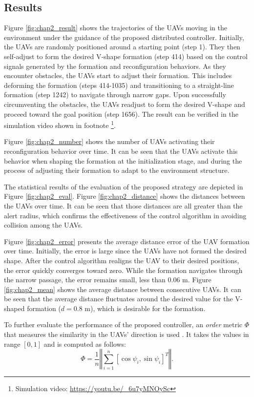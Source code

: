 \subsection{Results}

Figure \ref{fig:chap2_result} shows the trajectories of the UAVs moving in the environment under the guidance of the proposed distributed controller. Initially, the UAVs are randomly positioned around a starting point (step 1). They then self-adjust to form the desired V-shape formation (step 414) based on the control signals generated by the formation and reconfiguration behaviors. As they encounter obstacles, the UAVs start to adjust their formation. This includes deforming the formation (steps 414-1035) and transitioning to a straight-line formation (step 1242) to navigate through narrow gaps. Upon successfully circumventing the obstacles, the UAVs readjust to form the desired V-shape and proceed toward the goal position (step 1656). The result can be verified in the simulation video shown in footnote \footnote{Simulation video: {\selectfont
\url{https://youtu.be/_6u7yMNOySc}}}. 

Figure \ref{fig:chap2_number} shows the number of UAVs activating their reconfiguration behavior over time. It can be seen that the UAVs activate this behavior when shaping the formation at the initialization stage, and during the process of adjusting their formation to adapt to the environment structure.

The statistical results of the evaluation of the proposed strategy are depicted in Figure \ref{fig:chap2_eval}. Figure \ref{fig:chap2_distance} shows the distances between the UAVs over time. It can be seen that those distances are all greater than the alert radius, which confirms the effectiveness of the control algorithm in avoiding collision among the UAVs.

Figure \ref{fig:chap2_error} presents the average distance error of the UAV formation over time. Initially, the error is large since the UAVs have not formed the desired shape. After the control algorithm realigns the UAV to their desired positions, the error quickly converges toward zero. While the formation navigates through the narrow passage, the error remains small, less than $0.06$ m. Figure \ref{fig:chap2_mean} shows the average distance between consecutive UAVs. It can be seen that the average distance fluctuates around the desired value for the V-shaped formation ($d=0.8$ m), which is desirable for the formation.

To further evaluate the performance of the proposed controller, an \textit{order} metric $\Phi$ that measures the similarity in the UAVs' direction is used \cite{Vicsek1995}. It takes the values in range $[0, 1]$ and is computed as follows:
\begin{equation}
    \Phi=\dfrac{1}{n}\left\Vert\sum_{i=1}^n{\left[\cos\psi_i, \sin\psi_i\right]^T}\right\Vert.
    \label{eq:order}
\end{equation}


